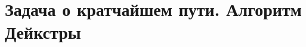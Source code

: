 \documentclass[discrete.tex]{subfiles}
\begin{document}
\section{Задача о кратчайшем пути. Алгоритм Дейкстры}
\end{document}
